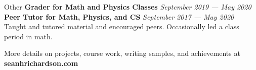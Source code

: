 \documentclass{resume}
\begin{document}
\begin{rSection}{Other}
    \textbf{Grader for Math and Physics Classes} \hfill \textit{September 2019 --- May 2020}\\
    \textbf{Peer Tutor for Math, Physics, and CS} \hfill \textit{September 2017 --- May 2020}\\
    Taught and tutored material and encouraged peers. Occasionally led a class period in math.
\end{rSection}

\begin{rSection}{}
	More details on projects, course work, writing samples, and achievements at \textbf{seanhrichardson.com}
\end{rSection}
\end{document}

